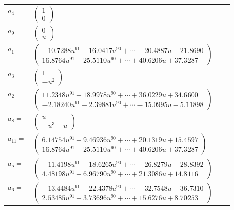 \documentclass[1p]{elsarticle_modified}
\theoremstyle{definition}
\begin{document}
\begin{tabular}{m{7pt} m{180pt} m{7pt} m{180pt} }
\flushright $a_{4}=$&$\begin{pmatrix}1\\0\end{pmatrix}$ \\
\flushright $a_{9}=$&$\begin{pmatrix}0\\u\end{pmatrix}$ \\
\flushright $a_{1}=$&$\begin{pmatrix}-10.7288 u^{91}-16.0417 u^{90}+\cdots-20.4887 u-21.8690\\16.8764 u^{91}+25.5110 u^{90}+\cdots+40.6206 u+37.3287\end{pmatrix}$ \\
\flushright $a_{3}=$&$\begin{pmatrix}1\\- u^2\end{pmatrix}$ \\
\flushright $a_{2}=$&$\begin{pmatrix}11.2348 u^{91}+18.9978 u^{90}+\cdots+36.0229 u+34.6600\\-2.18240 u^{91}-2.39881 u^{90}+\cdots-15.0995 u-5.11898\end{pmatrix}$ \\
\flushright $a_{8}=$&$\begin{pmatrix}u\\- u^3+u\end{pmatrix}$ \\
\flushright $a_{11}=$&$\begin{pmatrix}6.14754 u^{91}+9.46936 u^{90}+\cdots+20.1319 u+15.4597\\16.8764 u^{91}+25.5110 u^{90}+\cdots+40.6206 u+37.3287\end{pmatrix}$ \\
\flushright $a_{5}=$&$\begin{pmatrix}-11.4198 u^{91}-18.6265 u^{90}+\cdots-26.8279 u-28.8392\\4.48198 u^{91}+6.96790 u^{90}+\cdots+21.3086 u+14.8116\end{pmatrix}$ \\
\flushright $a_{6}=$&$\begin{pmatrix}-13.4484 u^{91}-22.4378 u^{90}+\cdots-32.7548 u-36.7310\\2.53485 u^{91}+3.73696 u^{90}+\cdots+15.6276 u+8.70253\end{pmatrix}$ \\

\end{tabular}
\end{document}
